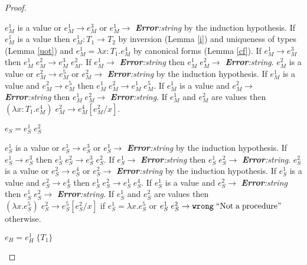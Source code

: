 \begin{theorem}
\begin{proof}
\begin{case}
$e_{M}^{1}$ is a value or $e_{M}^{1}\rightarrow e_{M}^{3}$ or $e_{M}^{1}\rightarrow$ \emph{\textbf{Error}:\;string} by the induction hypothesis.  If $e_{M}^{1}$ is a value then $e_{M}^{1}:T_{1}\rightarrow T_{2}$ by inversion (Lemma \ref{i}) and uniqueness of types (Lemma \ref{uot}) and $e_{M}^{1}=\lambda x:T_{1}.e_{M}^{4}$ by canonical forms (Lemma \ref{cf}).  If $e_{M}^{1}\rightarrow e_{M}^{3}$ then $e_{M}^{1}\;e_{M}^{2}\rightarrow e_{M}^{3}\;e_{M}^{2}$.  If $e_{M}^{1}\rightarrow$ \emph{\textbf{Error}:\;string} then $e_{M}^{1}\;e_{M}^{2}\rightarrow$ \emph{\textbf{Error}:\;string}.  $e_{M}^{2}$ is a value or $e_{M}^{2}\rightarrow e_{M}^{5}$ or $e_{M}^{2}\rightarrow$ \emph{\textbf{Error}:\;string} by the induction hypothesis.  If $e_{M}^{1}$ is a value and $e_{M}^{2}\rightarrow e_{M}^{5}$ then $e_{M}^{1}\;e_{M}^{2}\rightarrow e_{M}^{1}\;e_{M}^{5}$.  If $e_{M}^{1}$ is a value and $e_{M}^{2}\rightarrow$ \emph{\textbf{Error}:\;string} then $e_{M}^{1}\;e_{M}^{2}\rightarrow$ \emph{\textbf{Error}:\;string}.  If $e_{M}^{1}$ and $e_{M}^{2}$ are values then $(\lambda x:T_{1}.e_{M}^{4})\;e_{M}^{2}\rightarrow e_{M}^{4}[e_{M}^{2}/x]$.
\end{case}
\begin{case}
$e_{S}=e_{S}^{1}\;e_{S}^{2}$

$e_{S}^{1}$ is a value or $e_{S}^{1}\rightarrow e_{S}^{3}$ or $e_{S}^{1}\rightarrow$ \emph{\textbf{Error}:\;string} by the induction hypothesis.  If $e_{S}^{1}\rightarrow e_{S}^{3}$ then $e_{S}^{1}\;e_{S}^{2}\rightarrow e_{S}^{3}\;e_{S}^{2}$.  If $e_{S}^{1}\rightarrow$ \emph{\textbf{Error}:\;string} then $e_{S}^{1}\;e_{S}^{2}\rightarrow$ \emph{\textbf{Error}:\;string}.  $e_{S}^{2}$ is a value or $e_{S}^{2}\rightarrow e_{S}^{4}$ or $e_{S}^{2}\rightarrow$ \emph{\textbf{Error}:\;string} by the induction hypothesis.  If $e_{S}^{1}$ is a value and $e_{S}^{2}\rightarrow e_{S}^{4}$ then $e_{S}^{1}\;e_{S}^{2}\rightarrow e_{S}^{1}\;e_{S}^{4}$.  If $e_{S}^{1}$ is a value and $e_{S}^{2}\rightarrow$ \emph{\textbf{Error}:\;string} then $e_{S}^{1}\;e_{S}^{2}\rightarrow$ \emph{\textbf{Error}:\;string}.  If $e_{S}^{1}$ and $e_{S}^{2}$ are values then $(\lambda x.e_{S}^{5})\;e_{S}^{2}\rightarrow e_{S}^{5}[e_{S}^{2}/x]$ if $e_{S}^{1}=\lambda x.e_{S}^{5}$ or $e_{S}^{1}\;e_{S}^{2}\rightarrow\mathtt{wrong}\;\mathrm{``Not\;a\;procedure"}$ otherwise.
\end{case}
\begin{case}
$e_{H}=e_{H}^{1}\;\lbrace T_{1}\rbrace$


\end{case}
\end{proof}
\end{theorem}
